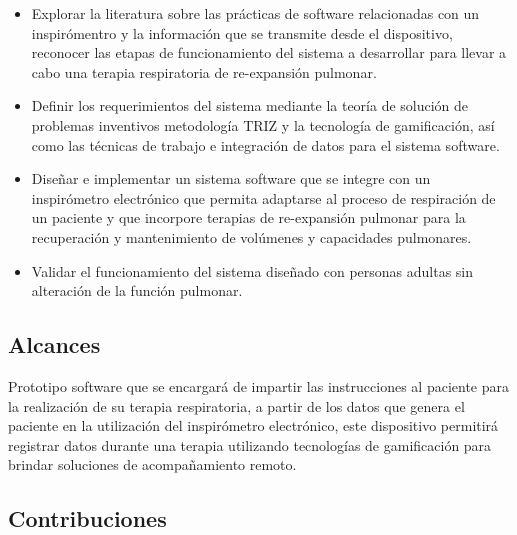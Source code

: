 \documentclass[12pt]{article}
\begin{document}
\begin{itemize}
\item Explorar la literatura sobre las pr\'acticas de software relacionadas con un inspir\'omentro y la informaci\'on que se transmite desde el dispositivo, reconocer las etapas de funcionamiento del sistema a desarrollar para llevar a cabo una terapia respiratoria de  re-expansi\'on pulmonar.

\item Definir los requerimientos del sistema mediante la teor\'ia de soluci\'on de problemas inventivos metodolog\'ia TRIZ y la tecnolog\'ia de gamificaci\'on, as\'i como las t\'ecnicas de trabajo e integraci\'on de datos para el sistema software.

\item Dise\~{n}ar e implementar un sistema software que se integre con un inspir\'ometro electr\'onico que permita adaptarse al proceso de respiraci\'on de un paciente y que incorpore terapias de re-expansi\'on pulmonar para la recuperaci\'on y mantenimiento de vol\'umenes y capacidades pulmonares.


\item Validar el funcionamiento del sistema dise\~{n}ado con personas adultas sin alteraci\'on de la funci\'on pulmonar.  %

\end{itemize}

\subsection{Alcances}

Prototipo software que se encargar\'a de impartir las instrucciones al paciente para la realizaci\'on de su terapia respiratoria, a partir de los datos que genera el paciente en la utilizaci\'on del inspir\'ometro electr\'onico, este dispositivo permitir\'a registrar datos durante una terapia utilizando tecnolog\'ias de gamificaci\'on para brindar soluciones de acompa\~{n}amiento remoto. 
\subsection{Contribuciones}
\end{document}
